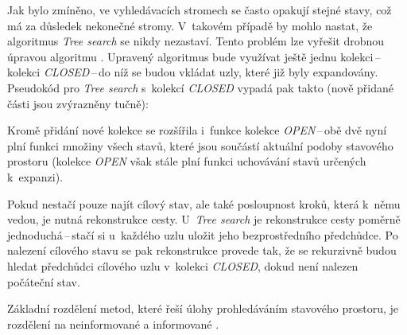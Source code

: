 Jak bylo zmíněno, ve vyhledávacích stromech se často opakují stejné stavy, což má za důsledek nekonečné stromy. V~takovém případě by mohlo nastat, že algoritmus \emph{Tree search} se nikdy nezastaví. Tento problém lze vyřešit drobnou úpravou algoritmu \cite{AI_Russel_Norvig}. Upravený algoritmus bude využívat ještě jednu kolekci\,--\,kolekci \emph{CLOSED}\,--\,do níž se budou vkládat uzly, které již byly expandovány. Pseudokód pro \emph{Tree search} s~kolekcí \emph{CLOSED} vypadá pak takto (nově přidané části jsou zvýrazněny tučně):
Kromě přidání nové kolekce se rozšířila i~funkce kolekce \emph{OPEN}\,--\,obě dvě nyní plní funkci množiny všech stavů, které jsou součástí aktuální podoby stavového prostoru (kolekce \emph{OPEN} však stále plní funkci uchovávání stavů určených k~expanzi).

Pokud nestačí pouze najít cílový stav, ale také posloupnost kroků, která k~němu vedou, je nutná rekonstrukce cesty. U~\emph{Tree search} je rekonstrukce cesty poměrně jednoduchá\,--\,stačí si u~každého uzlu uložit jeho bezprostředního předchůdce. Po nalezení cílového stavu se pak rekonstrukce provede tak, že se rekurzivně budou hledat předchůdci cílového uzlu v~kolekci \emph{CLOSED}, dokud není nalezen počáteční stav.

Základní rozdělení metod, které řeší úlohy prohledáváním stavového prostoru, je rozdělení na neinformované a informované \cite{AI_Russel_Norvig}.

